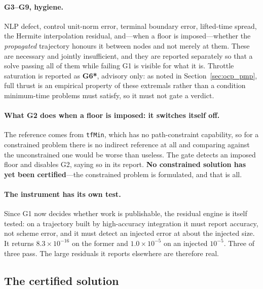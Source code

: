 \documentclass[11pt]{article}
\newcommand{\code}[1]{\texttt{#1}}
\begin{document}
\paragraph{G3--G9, hygiene.} NLP defect, control unit-norm error, terminal
boundary error, lifted-time spread, the Hermite interpolation residual, and---when
a floor is imposed---whether the \emph{propagated} trajectory honours it between
nodes and not merely at them. These are necessary and jointly insufficient, and
they are reported separately so that a solve passing all of them while failing G1
is visible for what it is. Throttle saturation is reported as \textbf{G6*},
advisory only: as noted in Section~\ref{sec:ocp_pmp}, full thrust is an empirical
property of these extremals rather than a condition minimum-time problems must
satisfy, so it must not gate a verdict.

\paragraph{What G2 does when a floor is imposed: it switches itself off.} The
reference comes from \code{tfMin}, which has no path-constraint capability, so
for a constrained problem there is no indirect reference at all and comparing
against the unconstrained one would be worse than useless. The gate detects an
imposed floor and disables G2, saying so in its report. \textbf{No constrained
solution has yet been certified}---the constrained problem is formulated, and
that is all.

\paragraph{The instrument has its own test.} Since G1 now decides whether work is
publishable, the residual engine is itself tested: on a trajectory built by
high-accuracy integration it must report accuracy, not scheme error, and it must
detect an injected error at about the injected size. It returns
$8.3\times10^{-16}$ on the former and $1.0\times10^{-5}$ on an injected
$10^{-5}$. Three of three pass. The large residuals it reports elsewhere are
therefore real.

\subsection{The certified solution}
\end{document}
